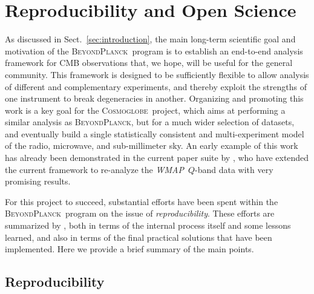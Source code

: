 \documentclass[twocolumn]{aa}
\def\WMAP{\emph{WMAP}}
\newcommand{\BP}{\textsc{BeyondPlanck}}
\newcommand{\cosmoglobe}{\textsc{Cosmoglobe}}
\begin{document}
\section{Reproducibility and Open Science}
\label{sec:software}


As discussed in Sect.~\ref{sec:introduction}, the main long-term
scientific goal and motivation of the \BP\ program is to establish an
end-to-end analysis framework for CMB observations that, we hope, will
be useful for the general community. This framework is designed to be
sufficiently flexible to allow analysis of different and complementary
experiments, and thereby exploit the strengths of one instrument to
break degeneracies in another. Organizing and promoting this work is a
key goal for the \cosmoglobe\ project, which aims at performing a
similar analysis as \BP, but for a much wider selection of datasets,
and eventually build a single statistically consistent and
multi-experiment model of the radio, microwave, and sub-millimeter
sky. An early example of this work has already been demonstrated in
the current paper suite by \citet{bp17}, who have extended the current
framework to re-analyze the \WMAP\ $Q$-band data with very promising
results.

For this project to succeed, substantial efforts have been spent
within the \BP\ program on the issue of \emph{reproducibility}. These
efforts are summarized by \citet{bp05}, both in terms of the internal
process itself and some lessons learned, and also in terms of the
final practical solutions that have been implemented. Here we provide
a brief summary of the main points.

\subsection{Reproducibility}
\end{document}
